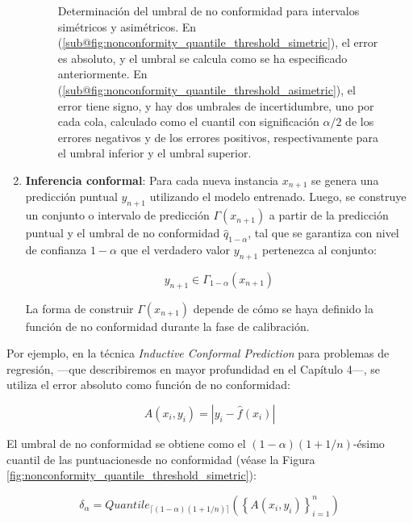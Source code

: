 \begin{enumerate}
\begin{figure}[htbp]
        \caption[
            Determinación del umbral de no conformidad para intervalos simétricos y asimétricos.
        ]{
            Determinación del umbral de no conformidad para intervalos simétricos y asimétricos. 
            En (\ref{sub@fig:nonconformity_quantile_threshold_simetric}), el error es absoluto, y el umbral
            se calcula como se ha especificado anteriormente. 
            En (\ref{sub@fig:nonconformity_quantile_threshold_asimetric}), el error tiene signo, y hay dos
            umbrales de incertidumbre, uno por cada cola, calculado como el cuantil con significación
            $\alpha/2$ de los errores negativos y de los errores positivos, respectivamente para el umbral
            inferior y el umbral superior. 
        }
        \label{fig:nonconformity_quantile_comparison}
    \end{figure}


    \item \textbf{Inferencia conformal}: Para cada nueva instancia $x_{n+1}$ se genera una predicción puntual
    $y_{n+1}$ utilizando el modelo entrenado. Luego, se construye un conjunto o intervalo de predicción
    $\Gamma(x_{n+1})$ a partir de la predicción puntual y el umbral de no conformidad $\hat{q}_{1-\alpha}$, 
    tal que se garantiza con nivel de confianza $1-\alpha$ que el verdadero valor $y_{n+1}$ pertenezca al
    conjunto:
    
    $$
    y_{n+1} \in \Gamma_{1-\alpha}(x_{n+1})
    $$

    La forma de construir $\Gamma(x_{n+1})$ depende de cómo se haya definido la función de no conformidad 
    durante la fase de calibración.

\end{enumerate}




Por ejemplo, en la técnica \textit{Inductive Conformal Prediction} \cite{papadopoulos2002} para problemas de regresión, ---que describiremos en mayor profundidad en el Capítulo 4---, se utiliza el error absoluto como función de no conformidad:

$$
A(x_i, y_i) = | y_i - \hat{f}(x_i) |
$$

El umbral de no conformidad se obtiene como el $(1 - \alpha)(1 + 1/n)$-ésimo cuantil de las puntuacionesde no conformidad (véase la Figura \ref{fig:nonconformity_quantile_threshold_simetric}):

$$
\delta_\alpha = Quantile_{ \lceil  (1-\alpha) (1 + 1/n)  \rceil } ( \left\{ A(x_i,y_i) \right\}_{i=1}^n )
$$


